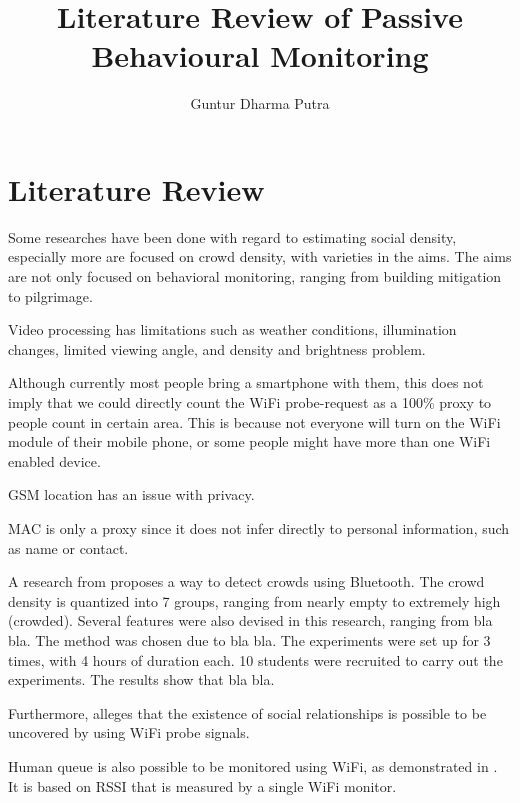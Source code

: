 \documentclass{article}
\begin{document}
\title{Literature Review of Passive Behavioural Monitoring}
\author{Guntur Dharma Putra}

\maketitle


\section{Literature Review}
Some researches have been done with regard to estimating social density, especially more are focused on crowd density, with varieties in the aims. The aims are not only focused on behavioral monitoring, ranging from building mitigation to pilgrimage.

Video processing has limitations such as weather conditions, illumination changes, limited viewing angle, and density and brightness problem. 

Although currently most people bring a smartphone with them, this does not imply that we could directly count the WiFi probe-request as a 100\% proxy to people count in certain area. This is because not everyone will turn on the WiFi module of their mobile phone, or some people might have more than one WiFi enabled device.

GSM location has an issue with privacy\cite{thesis017}.

MAC is only a proxy since it does not infer directly to personal information, such as name or contact.

A research from \cite{thesis008} proposes a way to detect crowds using Bluetooth. The crowd density is quantized into 7 groups, ranging from nearly empty to extremely high (crowded). Several features were also devised in this research, ranging from bla bla. 
The method was chosen due to bla bla.
The experiments were set up for 3 times, with 4 hours of duration each. 10 students were recruited to carry out the experiments.
The results show that bla bla.

Furthermore, \cite{thesis014} alleges that the existence of social relationships is possible to be uncovered by using WiFi probe signals.

Human queue is also possible to be monitored using WiFi, as demonstrated in \cite{thesis012}. It is based on RSSI that is measured by a single WiFi monitor.
\end{document}
